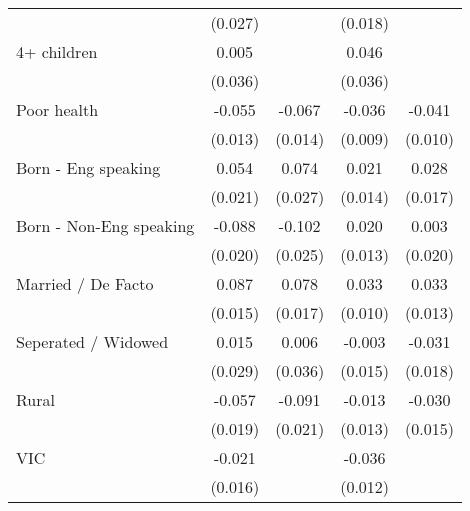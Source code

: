{\begin{tabular}{l*{4}{c}}
                    &     (0.027)         &                     &     (0.018)         &                     \\
[1em]
4+ children         &       0.005         &                     &       0.046         &                     \\
                    &     (0.036)         &                     &     (0.036)         &                     \\
[1em]
Poor health         &      -0.055\sym{***}&      -0.067\sym{***}&      -0.036\sym{***}&      -0.041\sym{***}\\
                    &     (0.013)         &     (0.014)         &     (0.009)         &     (0.010)         \\
[1em]
Born - Eng speaking &       0.054\sym{**} &       0.074\sym{**} &       0.021         &       0.028         \\
                    &     (0.021)         &     (0.027)         &     (0.014)         &     (0.017)         \\
[1em]
Born - Non-Eng speaking&      -0.088\sym{***}&      -0.102\sym{***}&       0.020         &       0.003         \\
                    &     (0.020)         &     (0.025)         &     (0.013)         &     (0.020)         \\
[1em]
Married / De Facto  &       0.087\sym{***}&       0.078\sym{***}&       0.033\sym{**} &       0.033\sym{*}  \\
                    &     (0.015)         &     (0.017)         &     (0.010)         &     (0.013)         \\
[1em]
Seperated / Widowed &       0.015         &       0.006         &      -0.003         &      -0.031         \\
                    &     (0.029)         &     (0.036)         &     (0.015)         &     (0.018)         \\
[1em]
Rural               &      -0.057\sym{**} &      -0.091\sym{***}&      -0.013         &      -0.030\sym{*}  \\
                    &     (0.019)         &     (0.021)         &     (0.013)         &     (0.015)         \\
[1em]
VIC                 &      -0.021         &                     &      -0.036\sym{**} &                     \\
                    &     (0.016)         &                     &     (0.012)         &                     \\

\end{tabular}}

